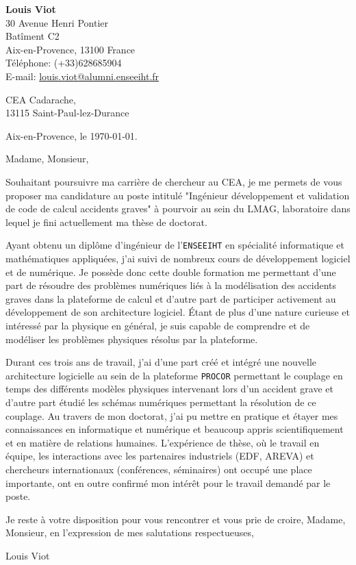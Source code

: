 \documentclass[11pt]{article}
\begin{document}
\begin{flushleft}
	\textbf{Louis Viot}\\
	30 Avenue Henri Pontier \\
	Batîment C2 \\
	Aix-en-Provence, 13100 France\\
	Téléphone: (+33)628685904 \\
	E-mail: \href{mailto:louis.viot@alumni.enseeiht.fr}{louis.viot@alumni.enseeiht.fr} \\
\end{flushleft}
\vspace{2 cm}
\begin{flushright}
	CEA Cadarache,\\
	13115 Saint-Paul-lez-Durance\\
\end{flushright}
\begin{flushright}
Aix-en-Provence, le \today{}.
\end{flushright}
Madame, Monsieur,

Souhaitant poursuivre ma carrière de chercheur au CEA, je me permets de vous proposer ma candidature au poste intitulé "Ingénieur développement et validation de code de calcul accidents graves" à pourvoir au sein du LMAG, laboratoire dans lequel je fini actuellement ma thèse de doctorat.

Ayant obtenu un diplôme d'ingénieur de l'\texttt{ENSEEIHT} en spécialité informatique et mathématiques appliquées, j'ai suivi de nombreux cours de développement logiciel et de numérique. Je possède donc cette double formation me permettant d'une part de résoudre des problèmes numériques liés à la modélisation des accidents graves dans la plateforme de calcul et d'autre part de participer activement au développement de son architecture logiciel. Étant de plus d'une nature curieuse et intéressé par la physique en général, je suis capable de comprendre et de modéliser les problèmes physiques résolus par la plateforme. 

Durant ces trois ans de travail, j'ai d'une part créé et intégré une nouvelle architecture logicielle au sein de la plateforme \texttt{PROCOR} permettant le couplage en temps des différents modèles physiques intervenant lors d'un accident grave et d'autre part étudié les schémas numériques permettant la résolution de ce couplage. Au travers de mon doctorat, j'ai pu mettre en pratique et étayer mes connaissances en informatique et numérique et beaucoup appris scientifiquement et en matière de relations humaines. L'expérience de thèse, où le travail en équipe, les interactions avec les partenaires industriels (EDF, AREVA) et chercheurs internationaux (conférences, séminaires) ont occupé une place importante, ont en outre confirmé mon intérêt pour le travail demandé par le poste.

Je reste à votre disposition pour vous rencontrer et vous prie de croire, Madame, Monsieur, en l'expression de mes salutations respectueuses,
\begin{flushright}
Louis Viot
\end{flushright}
\end{document}
